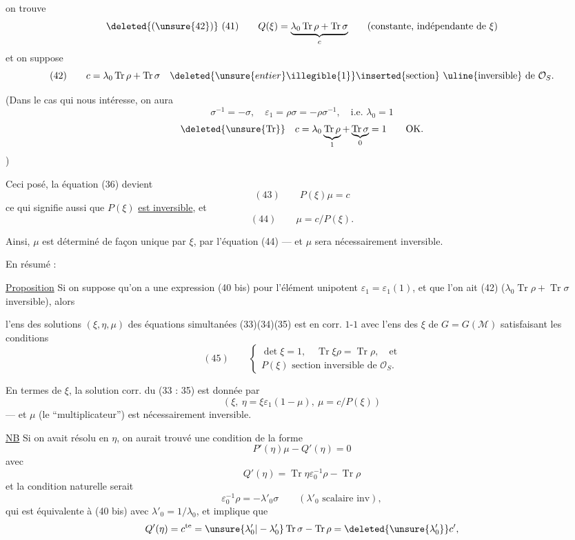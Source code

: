 on trouve
\[
\deleted{(\unsure{42})}\ (41)\qquad
Q(\xi)=\underbrace{\lambda_0\operatorname{Tr}\rho+\operatorname{Tr}\sigma}_{c}
\qquad
(\text{constante, indépendante de }\xi)
\]
et on suppose
\[
(42)\qquad
c=\lambda_0\operatorname{Tr}\rho+\operatorname{Tr}\sigma
\quad
\deleted{\unsure{entier}\illegible{1}}
\inserted{\text{section}}\text{ \uline{inversible} de }\mathcal O_S.
\]

(Dans le cas qui nous intéresse, on aura
\[
\sigma^{-1}=-\sigma,\quad
\varepsilon_1=\rho\sigma=-\rho\sigma^{-1},\quad
\text{i.e. }\lambda_0=1
\]
\[
\deleted{\unsure{\operatorname{Tr}}}\quad
c=\lambda_0\underbrace{\operatorname{Tr}\rho}_{1}
+\underbrace{\operatorname{Tr}\sigma}_{0}=1
\qquad\text{OK.}
\]
)

Ceci posé, la  équation (36) devient
\[
(43)\qquad P(\xi)\mu=c
\]
ce qui signifie aussi que $P(\xi)$ \uline{est inversible}, et
\[
(44)\qquad \mu=c/P(\xi).
\]

Ainsi, $\mu$ est déterminé de façon unique par $\xi$, par l'équation (44) ---
et $\mu$ sera nécessairement inversible.

En résumé :

\uline{Proposition} Si on suppose qu'on a 
une expression (40 bis) pour l'élément unipotent
$\varepsilon_1=\varepsilon_1(1)$, et que l'on ait (42)
($\lambda_0\operatorname{Tr}\rho+\operatorname{Tr}\sigma$ inversible), alors


l'ens des solutions  $(\xi,\eta,\mu)$ des
équations simultanées (33)(34)(35)
est en corr. $1$-$1$ avec l'ens des $\xi$
 de $G=G(\mathcal{M})$
satisfaisant les conditions
\[
(45)\qquad
\left\{
\begin{gathered}
\det\xi=1,\quad \operatorname{Tr}\xi\rho=\operatorname{Tr}\rho,\quad\text{et}\\
P(\xi)\text{ section inversible de }\mathcal O_S.
\end{gathered}
\right.
\]

En termes de $\xi$, la solution corr. du  (33 : 35)
est donnée par
\[
(\xi,\ \eta=\xi\varepsilon_1(1-\mu),\ \mu=c/P(\xi))
\]
--- et $\mu$ (le “multiplicateur”) est nécessairement inversible.

\uline{NB} Si on avait résolu en $\eta$, on aurait
trouvé une condition de la forme
\[
P'(\eta)\mu-Q'(\eta)=0
\]
avec
\[
Q'(\eta)=\operatorname{Tr}\eta\varepsilon_0^{-1}\rho-\operatorname{Tr}\rho
\]
et la condition naturelle serait
\[
\varepsilon_0^{-1}\rho=-\lambda'_0\sigma
\qquad(\lambda'_0\text{ scalaire inv}),
\]
qui est équivalente à (40 bis) avec $\lambda'_0=1/\lambda_0$,
et implique que
\[
Q'(\eta)=c^{\mathrm{te}}
=\unsure{\lambda'_0|-\lambda'_0}\operatorname{Tr}\sigma-\operatorname{Tr}\rho
=\deleted{\unsure{\lambda'_0}}c',
\]

